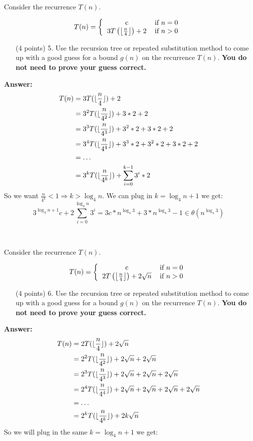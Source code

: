 \documentclass[paper=a4, fontsize=11pt]{scrartcl}
\DeclarePairedDelimiter\floor{\lfloor}{\rfloor}
\numberwithin{equation}{section}		%
\numberwithin{figure}{section}			%
\numberwithin{table}{section}				%
\begin{document}
Consider the recurrence $T(n)$.  

\[
T(n) = \left\{
\begin{tabular}{cc}
c & \text{if} $n=0$ \\
$3T\left(\left\lfloor\frac{n}{4}\right\rfloor\right)+2$ & \text{if} $n>0$ \\
\end{tabular}\right.
\]
\begin{enumerate}
\item [(4 points) 5.] Use the recursion tree or repeated substitution method to come up with a good guess for a bound $g(n)$ on the recurrence $T(n)$.  \textbf{You do not need to prove your guess correct.}  
\end{enumerate}
\textbf{Answer:}
\begin{align*}
	T(n) &= 3T(\floor{\frac{n}{4}}) + 2 \\
		&= 3^2T(\floor{\frac{n}{4^2}}) + 3*2 + 2 \\
		&= 3^3T(\floor{\frac{n}{4^3}}) + 3^2*2 + 3*2 + 2 \\
		&= 3^4T(\floor{\frac{n}{4^4}}) + 3^3*2 + 3^2*2 + 3*2 + 2 \\
		&= \dots \\
		&= 3^kT(\floor{\frac{n}{4^k}}) + \sum_{i=0}^{k-1}3^i*2
\end{align*}
So we want $\frac{n}{4^k} < 1 \Rightarrow k > \log_4 n$. We can plug in $k = \log_4 n + 1$ we get:
	$$3^{\log_4 n +1}c +2\sum_{i=0}^{\log_4 n} 3^i = 3c*n^{\log_4 3} + 3*n^{\log_4 3} -1 \in \theta(n^{\log_4 3})$$

\

Consider the recurrence $T(n)$.  

\[
T(n) = \left\{
\begin{tabular}{cc}
c & \text{if} $n=0$ \\
$2T\left(\left\lfloor\frac{n}{4}\right\rfloor\right)+2\sqrt{n}$ & \text{if} $n>0$ \\
\end{tabular}\right.
\]
\begin{enumerate}
\item [(4 points) 6.] Use the recursion tree or repeated substitution method to come up with a good guess for a bound $g(n)$ on the recurrence $T(n)$.  \textbf{You do not need to prove your guess correct.}  
\end{enumerate}
\textbf{Answer:}
\begin{align*}
T(n) &= 2T(\floor{\frac{n}{4}}) + 2\sqrt{n} \\
&= 2^2T(\floor{\frac{n}{4^2}}) + 2\sqrt{n} + 2\sqrt{n} \\
&= 2^3T(\floor{\frac{n}{4^3}}) + 2\sqrt{n} + 2\sqrt{n} + 2\sqrt{n} \\
&= 2^4T(\floor{\frac{n}{4^4}}) + 2\sqrt{n} + 2\sqrt{n} + 2\sqrt{n} + 2\sqrt{n} \\
&= \dots \\
&= 2^kT(\floor{\frac{n}{4^k}}) + 2k\sqrt{n}
\end{align*}
So we will plug in the same $k=\log_4 n + 1$ we get:
\end{document}
